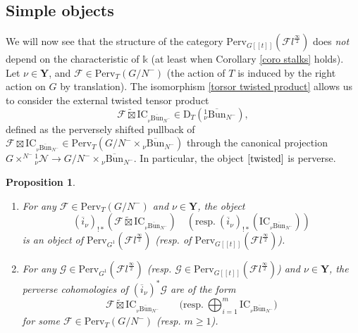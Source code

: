 \documentclass[11pt]{amsart}
\theoremstyle{plain}
\newtheorem{prop}[thm]{Proposition}
\theoremstyle{remark}
\numberwithin{equation}{section}
\begin{document}
	\subsection{Simple objects} 
	We will now see that the structure of the category $\mathrm{Perv}_{G[[t]]}(\mathcal{F}l^{\frac{\infty}{2}})$ does \textit{not} depend on the characteristic of $\mathbb{k}$ (at least when Corollary \ref{coro stalks} holds). Let $\nu\in\mathbf{Y}$, and $\mathcal{F}\in\mathrm{Perv}_T(G/N^-)$ (the action of $T$ is induced by the right action on $G$ by translation). The isomorphism \eqref{torsor twisted product} allows us to consider the external twisted tensor product
	\begin{equation}\label{twisted}
		\mathcal{F}\widetilde{\boxtimes}\mathrm{IC}_{_{\nu}\overline{\mathrm{Bun}}_{N^-}}\in \mathrm{D}_T({^1_{\nu}\overline{\mathrm{Bun}}_{N^-}}),
	\end{equation}
	defined as the perversely shifted pullback of $\mathcal{F}\boxtimes\mathrm{IC}_{_{\nu}\overline{\mathrm{Bun}}_{N^-}}\in \mathrm{Perv}_T({G/N^-\times {_\nu\overline{\mathrm{Bun}}_{N^-}}})$ through the canonical projection $G\times^{N^-}{^1_\nu\mathcal{N}}\to G/N^-\times {_\nu\overline{\mathrm{Bun}}_{N^-}}$. In particular, the object $\eqref{twisted}$ is perverse.
	\begin{prop}{{\cite[Proposition 4.2.4]{ABBGM}}}\label{simple objects prop}
		\begin{enumerate}
			\item 	For any $\mathcal{F}\in\mathrm{Perv}_T(G/N^-)$ and $\nu\in\mathbf{Y}$, the object 
			$$(\overline{i}_\nu)_{!*}(\mathcal{F}\widetilde{\boxtimes}\mathrm{IC}_{_{\nu}\overline{\mathrm{Bun}}_{N^-}})\quad (\text{resp.}~ (\overline{i}_\nu)_{!*}(\mathrm{IC}_{_{\nu}\overline{\mathrm{Bun}}_{N^-}})) $$ is an object of $\mathrm{Perv}_{G^1}(\mathcal{F}l^{\frac{\infty}{2}})$ (resp. of $\mathrm{Perv}_{G[[t]]}(\mathcal{F}l^{\frac{\infty}{2}})$).
			\item  For any $\mathcal{G}\in \mathrm{Perv}_{G^1}(\mathcal{F}l^{\frac{\infty}{2}})$ (resp. $\mathcal{G}\in \mathrm{Perv}_{G[[t]]}(\mathcal{F}l^{\frac{\infty}{2}})$) and $\nu\in\mathbf{Y}$, the perverse cohomologies of $(\overline{i}_\nu)^*\mathcal{G}$ are of the form 
			$$\mathcal{F}\widetilde{\boxtimes}\mathrm{IC}_{_{\nu}\overline{\mathrm{Bun}}_{N^-}}\qquad \text{(resp.}~ \bigoplus_{i=1}^m\mathrm{IC}_{_{\nu}\overline{\mathrm{Bun}}_{N^-}})$$ 
			for some $\mathcal{F}\in\mathrm{Perv}_T(G/N^-)$ (resp. $m\geq1$).
		\end{enumerate}
		
	\end{prop}
\end{document}
